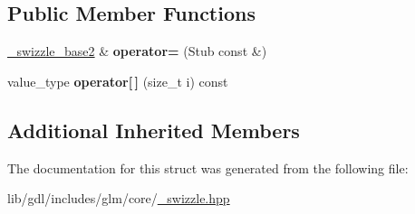 \subsection*{Public Member Functions}
\begin{DoxyCompactItemize}
\item 
\hypertarget{structglm_1_1detail_1_1__swizzle__base2_3_01_value_type_00_01_vec_type_00_01_n_00_01_e0_00_01_e1_00_01_e2_00_01_e3_00_011_01_4_a70764f1278bf81e27f79fe3f4a81de2d}{}\hyperlink{structglm_1_1detail_1_1__swizzle__base2}{\+\_\+swizzle\+\_\+base2} \& {\bfseries operator=} (Stub const \&)\label{structglm_1_1detail_1_1__swizzle__base2_3_01_value_type_00_01_vec_type_00_01_n_00_01_e0_00_01_e1_00_01_e2_00_01_e3_00_011_01_4_a70764f1278bf81e27f79fe3f4a81de2d}

\item 
\hypertarget{structglm_1_1detail_1_1__swizzle__base2_3_01_value_type_00_01_vec_type_00_01_n_00_01_e0_00_01_e1_00_01_e2_00_01_e3_00_011_01_4_af6e79bb269160e9d1c7e3959bbd7acc2}{}value\+\_\+type {\bfseries operator\mbox{[}$\,$\mbox{]}} (size\+\_\+t i) const \label{structglm_1_1detail_1_1__swizzle__base2_3_01_value_type_00_01_vec_type_00_01_n_00_01_e0_00_01_e1_00_01_e2_00_01_e3_00_011_01_4_af6e79bb269160e9d1c7e3959bbd7acc2}

\end{DoxyCompactItemize}
\subsection*{Additional Inherited Members}


The documentation for this struct was generated from the following file\+:\begin{DoxyCompactItemize}
\item 
lib/gdl/includes/glm/core/\hyperlink{__swizzle_8hpp}{\+\_\+swizzle.\+hpp}\end{DoxyCompactItemize}
